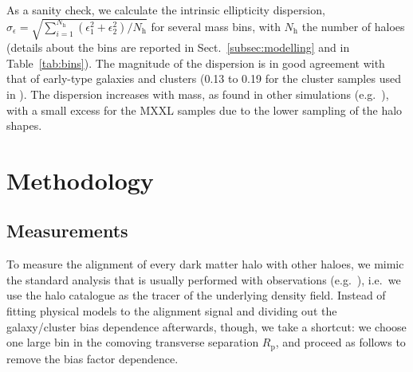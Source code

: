 \documentclass[a4paper,fleqn,usenatbib]{mnras}
\begin{document}
As a sanity check, we calculate the intrinsic ellipticity dispersion, $\sigma_{\epsilon} = \sqrt{\sum_{i=1}^{N_\mathrm{h}} (\epsilon_1^2+\epsilon_2^2)/N_\mathrm{h}}$ for several mass bins, with $N_\mathrm{h}$ the number of haloes (details about the bins are reported in Sect.~\ref{subsec:modelling} and in Table~\ref{tab:bins}). The magnitude of the dispersion is in good agreement with that of early-type galaxies \citep{Joachimietal2013a} and clusters (0.13 to 0.19 for the cluster samples used in \citealt{vanUitertJoachimi2017}). The dispersion increases with mass, as found in other simulations (e.g.\ \citealt{Despalietal2014, Schrabbacketal2015}), with a small excess for the MXXL samples due to the lower sampling of the halo shapes.

\section{Methodology}
\label{sec:method}
\subsection{Measurements}
\label{subsec:measurements}
To measure the alignment of every dark matter halo with other haloes, we mimic the standard analysis that is usually performed with observations (e.g.\ \citealt{vanUitertJoachimi2017}), i.e.\ we use the halo catalogue as the tracer of the underlying density field. Instead of fitting physical models to the alignment signal and dividing out the galaxy/cluster bias dependence afterwards, though, we take a shortcut: we choose one large bin in the comoving transverse separation $R_{\mathrm{p}}$, and proceed as follows to remove the bias factor dependence.
\end{document}
